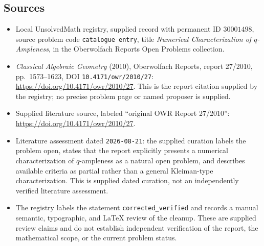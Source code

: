 \documentclass[11pt]{article}
\begin{document}
\subsection{Sources}
\begin{itemize}
\item Local UnsolvedMath registry, supplied record with permanent ID \(30001498\), source problem code \texttt{catalogue entry}, title \emph{Numerical Characterization of \(q\)-Ampleness}, in the Oberwolfach Reports Open Problems collection.
\item \emph{Classical Algebraic Geometry} (2010), Oberwolfach Reports, report 27/2010, pp.~1573--1623, DOI \texttt{10.4171/owr/2010/27}: \url{https://doi.org/10.4171/owr/2010/27}. This is the report citation supplied by the registry; no precise problem page or named proposer is supplied.
\item Supplied literature source, labeled ``original OWR Report 27/2010'': \url{https://doi.org/10.4171/owr/2010/27}.
\item Literature assessment dated \texttt{2026-08-21}: the supplied curation labels the problem open, states that the report explicitly presents a numerical characterization of \(q\)-ampleness as a natural open problem, and describes available criteria as partial rather than a general Kleiman-type characterization. This is supplied dated curation, not an independently verified literature assessment.
\item The registry labels the statement \texttt{corrected\_verified} and records a manual semantic, typographic, and LaTeX review of the cleanup. These are supplied review claims and do not establish independent verification of the report, the mathematical scope, or the current problem status.
\end{itemize}
\end{document}
